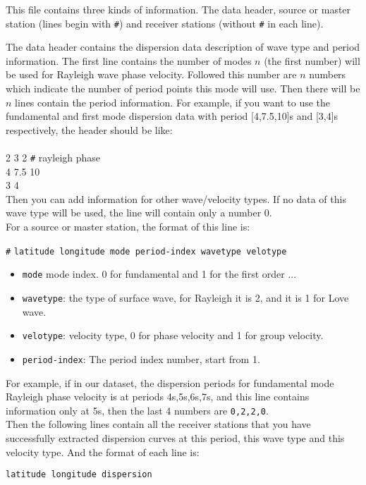 \documentclass[UTF8]{article}
\begin{document}
This file contains three kinds of information. The data header, source or master station (lines begin with
\verb!#!) and receiver stations (without \verb!#! in each
line).

The data header contains the dispersion data description of wave type and period information.  The first line contains the number of modes $n$ (the first number) will be used for Rayleigh wave phase velocity. Followed this number are $n$ numbers which indicate the number of period points this mode will use. Then there will be $n$ lines contain the period information.  For example, if you want to use the fundamental and first mode dispersion data with period [4,7.5,10]s and [3,4]s respectively, the header should be like: \\ \\ 
2 3 2 \verb!#! rayleigh phase \\
4 7.5 10 \\ 
3 4 \\

Then you can add information for other wave/velocity types. If no data of this wave type will be used, the line will contain only a number 0.\\

For a source or master station, the format of 
this line is:
\begin{center}
    \verb!#! \texttt{latitude longitude mode period-index wavetype
     velotype}
\end{center}

\begin{itemize}
    \item \texttt{mode} mode index. 0 for fundamental and 1 for the first order ...
    \item \texttt{wavetype}: the type of surface wave, for 
                            Rayleigh it is 2, and it is 1 for Love wave.
    \item \texttt{velotype}: velocity type, 0 for phase velocity
                            and 1 for group velocity.
    \item \texttt{period-index}: The period index number, start from 1.
\end{itemize}
For example, if in our dataset, the dispersion periods 
for fundamental mode Rayleigh phase velocity is at periods 4s,5s,6s,7s, 
and this line contains information only at 5s, then 
the last 4 numbers 
are \texttt{0,2,2,0}.\\

Then the following lines contain all the receiver stations
that you have successfully extracted dispersion curves
at this period, this wave type and this velocity type.
And the format of each line is:
\begin{center}
    \texttt{latitude longitude  dispersion}
\end{center} 
\end{document}
